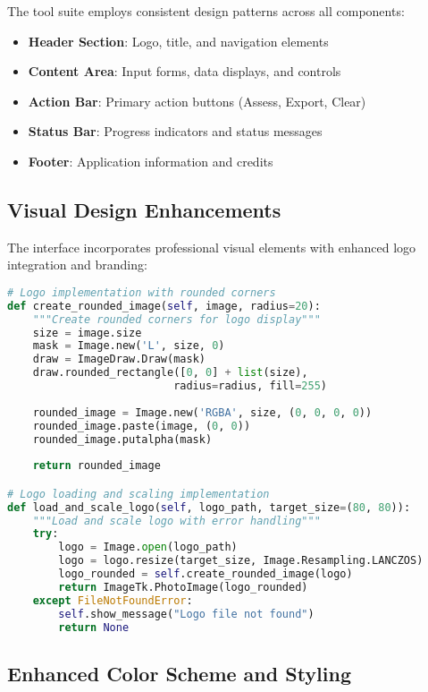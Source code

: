 \documentclass[binding=0.6cm]{sapthesis}
\begin{document}
The tool suite employs consistent design patterns across all components:

\begin{itemize}
    \item \textbf{Header Section}: Logo, title, and navigation elements
    \item \textbf{Content Area}: Input forms, data displays, and controls
    \item \textbf{Action Bar}: Primary action buttons (Assess, Export, Clear)
    \item \textbf{Status Bar}: Progress indicators and status messages
    \item \textbf{Footer}: Application information and credits
\end{itemize}

\subsection{Visual Design Enhancements}

The interface incorporates professional visual elements with enhanced logo integration and branding:

\begin{lstlisting}[language=Python, caption=Logo Integration and Visual Enhancement]
# Logo implementation with rounded corners
def create_rounded_image(self, image, radius=20):
    """Create rounded corners for logo display"""
    size = image.size
    mask = Image.new('L', size, 0)
    draw = ImageDraw.Draw(mask)
    draw.rounded_rectangle([0, 0] + list(size), 
                          radius=radius, fill=255)
    
    rounded_image = Image.new('RGBA', size, (0, 0, 0, 0))
    rounded_image.paste(image, (0, 0))
    rounded_image.putalpha(mask)
    
    return rounded_image

# Logo loading and scaling implementation
def load_and_scale_logo(self, logo_path, target_size=(80, 80)):
    """Load and scale logo with error handling"""
    try:
        logo = Image.open(logo_path)
        logo = logo.resize(target_size, Image.Resampling.LANCZOS)
        logo_rounded = self.create_rounded_image(logo)
        return ImageTk.PhotoImage(logo_rounded)
    except FileNotFoundError:
        self.show_message("Logo file not found")
        return None
\end{lstlisting}

\subsection{Enhanced Color Scheme and Styling}
\end{document}
